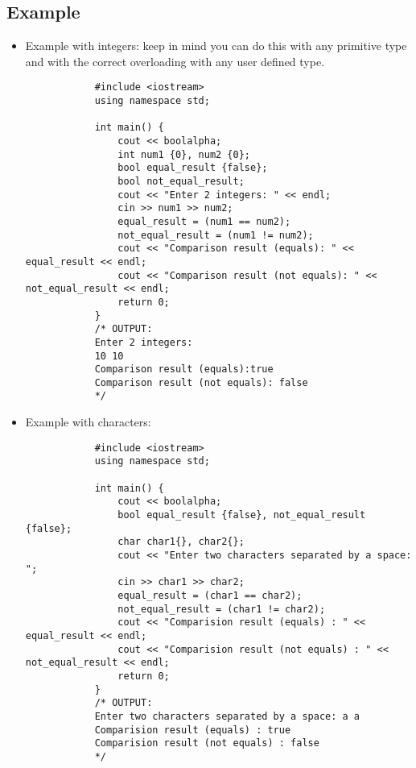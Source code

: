 \subsection{Example}
\begin{itemize}
    \item Example with integers: keep in mind you can do this with any primitive type and with the correct overloading with any user defined type.
        \begin{verbatim}
            #include <iostream>
            using namespace std;

            int main() {
                cout << boolalpha;
                int num1 {0}, num2 {0};
                bool equal_result {false};
                bool not_equal_result;
                cout << "Enter 2 integers: " << endl;
                cin >> num1 >> num2;
                equal_result = (num1 == num2);
                not_equal_result = (num1 != num2);
                cout << "Comparison result (equals): " << equal_result << endl;
                cout << "Comparison result (not equals): " << not_equal_result << endl;
                return 0;
            }
            /* OUTPUT:
            Enter 2 integers:
            10 10
            Comparison result (equals):true
            Comparison result (not equals): false
            */
        \end{verbatim}
    
    \item Example with characters:
        \begin{verbatim}
            #include <iostream>
            using namespace std;

            int main() {
                cout << boolalpha;
                bool equal_result {false}, not_equal_result {false};
                char char1{}, char2{};
                cout << "Enter two characters separated by a space: ";
                cin >> char1 >> char2;
                equal_result = (char1 == char2);
                not_equal_result = (char1 != char2);
                cout << "Comparision result (equals) : " << equal_result << endl;
                cout << "Comparision result (not equals) : " << not_equal_result << endl;
                return 0;
            }
            /* OUTPUT:
            Enter two characters separated by a space: a a
            Comparision result (equals) : true
            Comparision result (not equals) : false
            */
        \end{verbatim}
    

\end{itemize}
